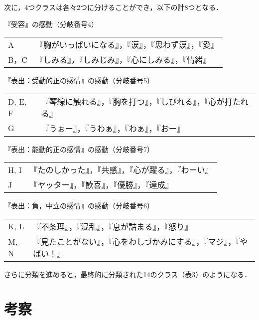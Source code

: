 \documentclass[japanese]{jnlp_1.3c}
\begin{document}
次に，4つクラスは各々2つに分けることができ，以下の計8つとなる．


『受容』の感動（分岐番号4）\par                               
\begin{tabular}{p{20mm}l}
A     & 『胸がいっぱいになる』，『涙』，『思わず涙』，『愛』\\
B，C  & 『しみる』，『しみじみ』，『心にしみる』，『情緒』  \\
\end{tabular}  \par                                            
『表出：受動的正の感情』の感動（分岐番号5）\par                 
\begin{tabular}{p{20mm}l}
D, E, F& 『琴線に触れる』，『胸を打つ』，『しびれる』，『心が打たれる』\\
G       & 『うぉー』，『うわぁ』，『わぁ』，『おー』                    \\
\end{tabular}  \par                                             
『表出：能動的正の感情』の感動（分岐番号7）\par                  
\begin{tabular}{p{20mm}l}
H, I & 『たのしかった』，『共感』，『心が躍る』，『わーい』\\
J     & 『ヤッター』，『歓喜』，『優勝』，『達成』          \\
\end{tabular}  \par                                             
『表出：負，中立の感情』の感動（分岐番号6）\par                  
\begin{tabular}{p{20mm}l}
K, L & 『不条理』，『混乱』，『息が詰まる』，『怒り』                      \\
M, N & 『見たことがない』，『心をわしづかみにする』，『マジ』，『やばい！』\\
\end{tabular}  \par                                              
さらに分類を進めると，最終的に分類された14のクラス（表3）のようになる．



\section{考察}
\end{document}
